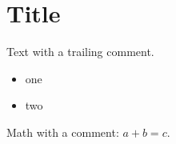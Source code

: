 \section{Title}

Text with a trailing comment. %

\begin{itemize}
  \item one %
  \item two
\end{itemize}

Math with a comment: $a + b %
= c$.
